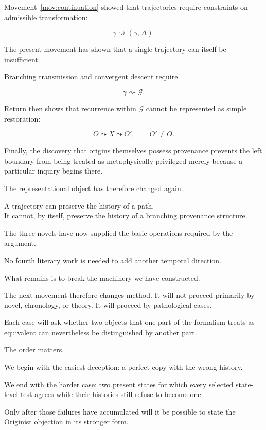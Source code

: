 \documentclass[
  11pt,
  a4paper,
  DIV=12,
  BCOR=0mm,
  parskip=half-
]{scrartcl}
\newcommand{\graphG}{\mathcal G}
\newcommand{\Adm}{\mathcal A}
\theoremstyle{definition}
\theoremstyle{plain}
\theoremstyle{remark}
\begin{document}
Movement~\ref{mov:continuation} showed that trajectories require constraints
on admissible transformation:

\[
  \gamma
  \rightsquigarrow
  (\gamma,\Adm).
\]

The present movement has shown that a single trajectory can itself be
insufficient.

Branching transmission and convergent descent require

\[
  \gamma
  \rightsquigarrow
  \graphG.
\]

Return then shows that recurrence within \(\graphG\) cannot be represented as
simple restoration:

\[
  O
  \leadsto
  X
  \leadsto
  O',
  \qquad
  O'\neq O.
\]

Finally, the discovery that origins themselves possess provenance prevents
the left boundary from being treated as metaphysically privileged merely
because a particular inquiry begins there.

The representational object has therefore changed again.

\begin{held}
\centering
A trajectory can preserve the history of a path.\\[3pt]
It cannot, by itself, preserve the history of a branching provenance
structure.
\end{held}

The three novels have now supplied the basic operations required by the
argument.

No fourth literary work is needed to add another temporal direction.

What remains is to break the machinery we have constructed.

The next movement therefore changes method. It will not proceed primarily by
novel, chronology, or theory. It will proceed by pathological cases.

Each case will ask whether two objects that one part of the formalism treats
as equivalent can nevertheless be distinguished by another part.

The order matters.

We begin with the easiest deception: a perfect copy with the wrong history.

We end with the harder case: two present states for which every selected
state-level test agrees while their histories still refuse to become one.

Only after those failures have accumulated will it be possible to state the
Originist objection in its stronger form.
\end{document}
